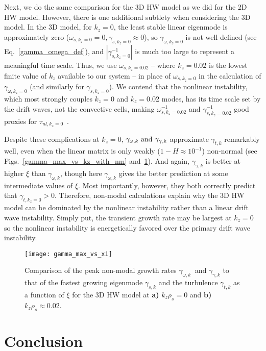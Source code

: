 \documentclass[twocolumn,showkeys,superscriptaddress]{revtex4}
\begin{document}
Next, we do the same comparison for the 3D HW model as we did for the 2D HW model. However, there is one additional subtlety when considering the 3D model. In the 3D model, for $k_z=0$, the least stable linear
eigenmode is approximately zero ($\omega_{s,k_z=0} = 0, \gamma_{s,k_z=0} \approx 0$), so $\gamma_{\omega,k_z=0}$ is not well defined (see Eq.~\ref{gamma_omega_def}), and $|\gamma_{s,k_z=0}^{-1}|$ is much too large to
represent a meaningful time scale. 
Thus, we use $\omega_{s,k_z=0.02}$ -- where $k_z=0.02$ is the lowest finite value of $k_z$ available to our system -- in place of
$\omega_{s,k_z=0}$ in the calculation of $\gamma_{\omega,k_z=0}$ (and similarly for $\gamma_{s,k_z=0}$). 
We contend that the nonlinear instability, which most strongly couples $k_z=0$ and $k_z=0.02$ modes, has its time scale set
by the drift waves, not the convective cells, making $\omega_{s,k_z=0.02}^{-1}$ and $\gamma_{s,k_z=0.02}^{-1}$ good proxies for $\tau_{nl,k_z=0}$~\cite{friedman2014}. 

Despite these complications at $k_z=0$,  $\gamma_{\omega,k} \ \rm{and} \ \gamma_{\gamma,k}$ approximate $\gamma_{t,k}$ remarkably well, even when the linear matrix is only weakly ($1-H \approx 10^{-1}$) non-normal
(see Figs.~\ref{gamma_max_vs_kz_with_nm} and~\ref{gamma_max_vs_xi}). And again, $\gamma_{\gamma,k}$ is better at higher $\xi$ than $\gamma_{\omega,k}$, though here $\gamma_{\omega,k}$ gives the better prediction
at some intermediate values of $\xi$. Most importantly, however, they both correctly predict that $\gamma_{t,k_z=0} > 0$.
Therefore, non-modal calculations explain why the 3D HW model can be dominated by the nonlinear instability rather than a linear drift wave instability. 
Simply put, the transient growth rate may be largest at $k_z=0$ so the nonlinear instability is energetically favored over the primary drift wave instability.

\begin{figure}
\centerline{\texttt{[image: gamma\_max\_vs\_xi]}}
\caption{Comparison of the peak non-modal growth rates $\gamma_{\omega,k} \ $ and $\gamma_{\gamma,k}$ to that of the fastest growing eigenmode $\gamma_{s,k}$ 
and the turbulence $\gamma_{t,k}$ as a function of $\xi$ for the 3D HW model at {\bf a)} $k_z \rho_s = 0$ and {\bf b)} $k_z \rho_s \approx 0.02$. }
\label{gamma_max_vs_xi}
\end{figure}


\section{Conclusion}
\end{document}

